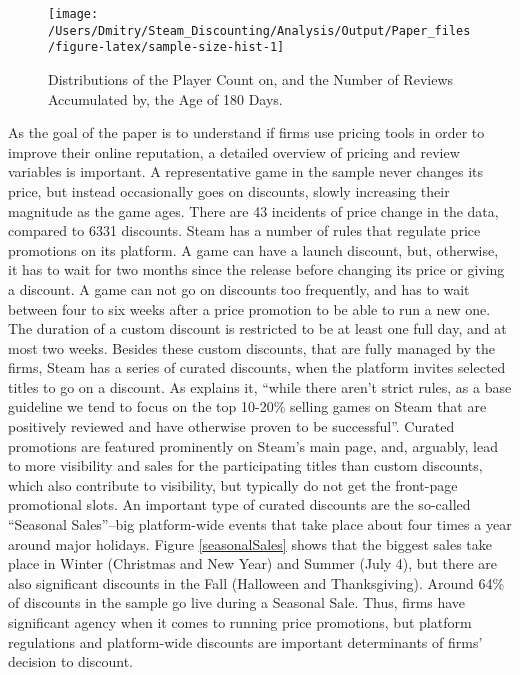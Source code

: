 \documentclass[12pt,pagebackref]{article}
\begin{document}
\begin{figure}[h]

{\centering \texttt{[image: /Users/Dmitry/Steam\_Discounting/Analysis/Output/Paper\_files/figure-latex/sample-size-hist-1]} 

}

\caption{\label{sampleSizeHist} Distributions of the Player Count on, and the Number of Reviews Accumulated by, the Age of 180 Days.}\label{fig:sample-size-hist}
\end{figure}

As the goal of the paper is to understand if firms use pricing tools in
order to improve their online reputation, a detailed overview of pricing
and review variables is important. A representative game in the sample
never changes its price, but instead occasionally goes on discounts,
slowly increasing their magnitude as the game ages. There are 43
incidents of price change in the data, compared to 6331 discounts. Steam
has a number of rules that regulate price promotions on its platform. A
game can have a launch discount, but, otherwise, it has to wait for two
months since the release before changing its price or giving a discount.
A game can not go on discounts too frequently, and has to wait between
four to six weeks after a price promotion to be able to run a new one.
The duration of a custom discount is restricted to be at least one full
day, and at most two weeks. Besides these custom discounts, that are
fully managed by the firms, Steam has a series of curated discounts,
when the platform invites selected titles to go on a discount. As
\citet{steamDiscounting} explains it, ``while there aren't strict rules,
as a base guideline we tend to focus on the top 10-20\% selling games on
Steam that are positively reviewed and have otherwise proven to be
successful''. Curated promotions are featured prominently on Steam's
main page, and, arguably, lead to more visibility and sales for the
participating titles than custom discounts, which also contribute to
visibility, but typically do not get the front-page promotional slots.
An important type of curated discounts are the so-called ``Seasonal
Sales''--big platform-wide events that take place about four times a
year around major holidays. Figure \ref{seasonalSales} shows that the
biggest sales take place in Winter (Christmas and New Year) and Summer
(July 4), but there are also significant discounts in the Fall
(Halloween and Thanksgiving). Around 64\% of discounts in the sample go
live during a Seasonal Sale. Thus, firms have significant agency when it
comes to running price promotions, but platform regulations and
platform-wide discounts are important determinants of firms' decision to
discount.
\end{document}
